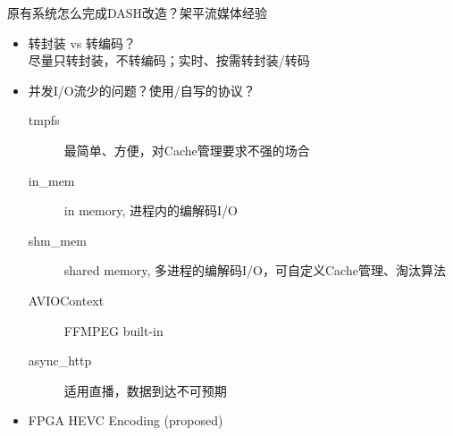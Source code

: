 \documentclass{beamer}
\begin{document}
\begin{frame}{原有系统怎么完成DASH改造？架平流媒体经验}
\begin{itemize}
\item 转封装 vs 转编码？\\
尽量只转封装，不转编码；实时、按需转封装/转码
\item 并发I/O流少的问题？使用/自写的协议？
	\begin{description}
	\item[tmpfs] 最简单、方便，对Cache管理要求不强的场合
	\item[in\_mem] in memory, 进程内的编解码I/O
	\item[shm\_mem] shared memory, 多进程的编解码I/O，可自定义Cache管理、淘汰算法
	\item[AVIOContext] FFMPEG built-in
	\item[async\_http] 适用直播，数据到达不可预期 %
\end{description}
\item FPGA HEVC Encoding (proposed)
\end{itemize}
\end{frame}
\end{document}
